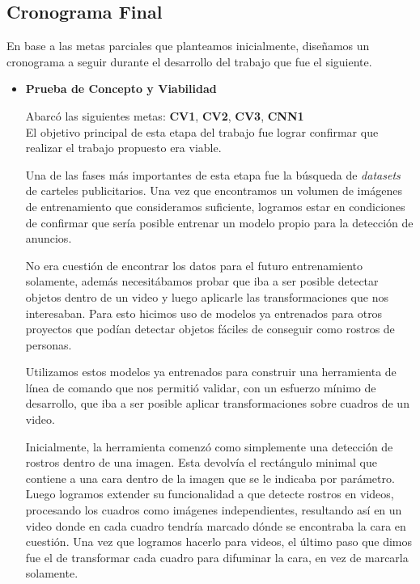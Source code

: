 \documentclass[a4paper]{article}
\begin{document}
\subsection{Cronograma Final}

En base a las metas parciales que planteamos inicialmente, diseñamos un cronograma a seguir durante el desarrollo del trabajo que fue el siguiente.

\begin{itemize}
\item \textbf{Prueba de Concepto y Viabilidad}

Abarcó las siguientes metas: \textbf{CV1}, \textbf{CV2}, \textbf{CV3}, \textbf{CNN1} \\

El objetivo principal de esta etapa del trabajo fue lograr confirmar que realizar el trabajo propuesto era viable.

Una de las fases más importantes de esta etapa fue la búsqueda de \textit{datasets} de carteles publicitarios. Una vez que encontramos un volumen de imágenes de entrenamiento que consideramos suficiente, logramos estar en condiciones de confirmar que sería posible entrenar un modelo propio para la detección de anuncios.

No era cuestión de encontrar los datos para el futuro entrenamiento solamente, además necesitábamos probar que iba a ser posible detectar objetos dentro de un video y luego aplicarle las transformaciones que nos interesaban. Para esto hicimos uso de modelos ya entrenados para otros proyectos que podían detectar objetos fáciles de conseguir como rostros de personas.

Utilizamos estos modelos ya entrenados para construir una herramienta de línea de comando que nos permitió validar, con un esfuerzo mínimo de desarrollo, que iba a ser posible aplicar transformaciones sobre cuadros de un video.

Inicialmente, la herramienta comenzó como simplemente una detección de rostros dentro de una imagen. Esta devolvía el rectángulo minimal que contiene a una cara dentro de la imagen que se le indicaba por parámetro.
Luego logramos extender su funcionalidad a que detecte rostros en videos, procesando los cuadros como imágenes independientes, resultando así en un video donde en cada cuadro tendría marcado dónde se encontraba la cara en cuestión.
Una vez que logramos hacerlo para videos, el último paso que dimos fue el de transformar cada cuadro para difuminar la cara, en vez de marcarla solamente.


\end{itemize}
\end{document}

